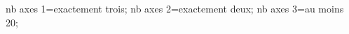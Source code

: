 \documentclass[exercice]{thedocument}%
\begin{document}
%
    \>nb axes 1=exactement trois;%
    \>nb axes 2=exactement deux;%
    \>nb axes 3=au moins 20;%
\end{document}
